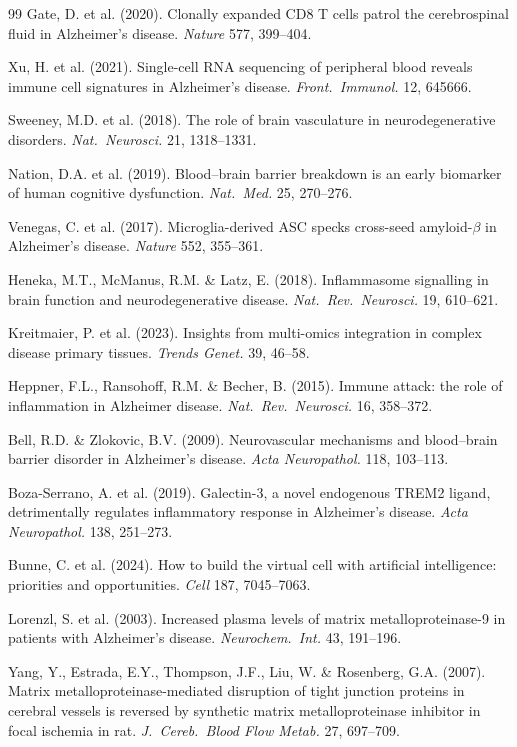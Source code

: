 \documentclass[12pt,a4paper]{article}
\begin{document}
\begin{thebibliography}{99}
 Gate, D. et al. (2020). Clonally expanded CD8 T cells patrol the cerebrospinal fluid in Alzheimer's disease. \textit{Nature} 577, 399--404.

 Xu, H. et al. (2021). Single-cell RNA sequencing of peripheral blood reveals immune cell signatures in Alzheimer's disease. \textit{Front.\ Immunol.} 12, 645666.

 Sweeney, M.D. et al. (2018). The role of brain vasculature in neurodegenerative disorders. \textit{Nat.\ Neurosci.} 21, 1318--1331.

 Nation, D.A. et al. (2019). Blood--brain barrier breakdown is an early biomarker of human cognitive dysfunction. \textit{Nat.\ Med.} 25, 270--276.

 Venegas, C. et al. (2017). Microglia-derived ASC specks cross-seed amyloid-$\beta$ in Alzheimer's disease. \textit{Nature} 552, 355--361.

 Heneka, M.T., McManus, R.M. \& Latz, E. (2018). Inflammasome signalling in brain function and neurodegenerative disease. \textit{Nat.\ Rev.\ Neurosci.} 19, 610--621.

 Kreitmaier, P. et al. (2023). Insights from multi-omics integration in complex disease primary tissues. \textit{Trends Genet.} 39, 46--58.

 Heppner, F.L., Ransohoff, R.M. \& Becher, B. (2015). Immune attack: the role of inflammation in Alzheimer disease. \textit{Nat.\ Rev.\ Neurosci.} 16, 358--372.

 Bell, R.D. \& Zlokovic, B.V. (2009). Neurovascular mechanisms and blood--brain barrier disorder in Alzheimer's disease. \textit{Acta Neuropathol.} 118, 103--113.

 Boza-Serrano, A. et al. (2019). Galectin-3, a novel endogenous TREM2 ligand, detrimentally regulates inflammatory response in Alzheimer's disease. \textit{Acta Neuropathol.} 138, 251--273.

 Bunne, C. et al. (2024). How to build the virtual cell with artificial intelligence: priorities and opportunities. \textit{Cell} 187, 7045--7063.

 Lorenzl, S. et al. (2003). Increased plasma levels of matrix metalloproteinase-9 in patients with Alzheimer's disease. \textit{Neurochem.\ Int.} 43, 191--196.

 Yang, Y., Estrada, E.Y., Thompson, J.F., Liu, W. \& Rosenberg, G.A. (2007). Matrix metalloproteinase-mediated disruption of tight junction proteins in cerebral vessels is reversed by synthetic matrix metalloproteinase inhibitor in focal ischemia in rat. \textit{J.\ Cereb.\ Blood Flow Metab.} 27, 697--709.


\end{thebibliography}
\end{document}
